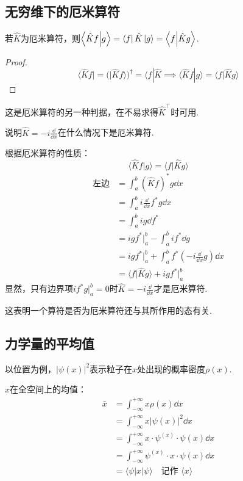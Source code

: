 \subsection{无穷维下的厄米算符}
\begin{proposition}
    若$\hat{K}$为厄米算符，则$\braket{\hat{K}f}{g} = \bra{f}\hat{K}\ket{g} = \braket{f}{\hat{K}g}$.
\end{proposition}
\begin{proof}
    $$\langle \hat{K} f | = ( | \hat{K} f \rangle )^{\dagger} = \langle f | \hat{K} \implies \langle \hat{K} f | g \rangle = \langle f | \hat{K} g \rangle$$
\end{proof}
这是厄米算符的另一种判据，在不易求得$\hat{K}^{\top}$时可用.
\begin{question}
    说明$\hat{K} = -i \frac{\dd}{\dd x}$在什么情况下是厄米算符.
\end{question}
\begin{solution}
    根据厄米算符的性质：
    $$\langle \hat{K} f | g \rangle = \langle f | \hat{K} g \rangle$$
    \begin{align*}
        \text{左边} &= \int_a^b (\hat{K} f)^* g \dd x \\
        &= \int_a^b i \frac{\dd}{\dd x} f^* g \dd x \\
        &= \int_a^b i g \dd{f^*} \\
        &= i g f^* \big|_a^b - \int_a^b i f^* \dd g \\
        &= i g f^* \big|_a^b + \int_a^b f^* (-i \frac{\dd}{\dd x} g) \dd x \\
        &= \langle f | \hat{K} g \rangle + i g f^* \big|_a^b
    \end{align*}
    显然，只有边界项$i f^* g \big|_a^b = 0$时$\hat{K} = -i \frac{\dd}{\dd x}$才是厄米算符.
\end{solution}

这表明一个算符是否为厄米算符还与其所作用的态有关.

\subsection{力学量的平均值}
以位置为例，$|\psi(x)|^2$表示粒子在$x$处出现的概率密度$\rho(x)$.

$x$在全空间上的均值：
\begin{align*}
    \bar{x} &= \int_{-\infty}^{+\infty} x \rho(x) \dd x \\
    &= \int_{-\infty}^{+\infty} x |\psi(x)|^2 \dd x \\
    &= \int_{-\infty}^{+\infty} x \cdot \psi^(x) \cdot \psi(x) \dd x \\
    &= \int_{-\infty}^{+\infty} \psi^(x) \cdot x \cdot \psi(x) \dd x \\
    &= \langle \psi | x | \psi \rangle \quad \text{记作 } \langle x \rangle
\end{align*}

